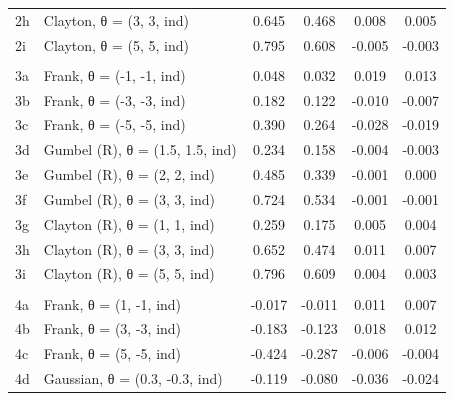 \documentclass[
]{article}
\begin{document}
\begin{longtable}[t]{llcccc}
\hspace{1em}2h & Clayton, θ = (3, 3, ind) & 0.645 & 0.468 & 0.008 & 0.005\\
\hspace{1em}2i & Clayton, θ = (5, 5, ind) & 0.795 & 0.608 & -0.005 & -0.003\\
\addlinespace[0.3em]
\multicolumn{6}{l}{\textbf{Scenario 3: (-, -, ind)}}\\
\hspace{1em}3a & Frank, θ = (-1, -1, ind) & 0.048 & 0.032 & 0.019 & 0.013\\
\hspace{1em}3b & Frank, θ = (-3, -3, ind) & 0.182 & 0.122 & -0.010 & -0.007\\
\hspace{1em}3c & Frank, θ = (-5, -5, ind) & 0.390 & 0.264 & -0.028 & -0.019\\
\hspace{1em}3d & Gumbel (R), θ = (1.5, 1.5, ind) & 0.234 & 0.158 & -0.004 & -0.003\\
\hspace{1em}3e & Gumbel (R), θ = (2, 2, ind) & 0.485 & 0.339 & -0.001 & 0.000\\
\hspace{1em}3f & Gumbel (R), θ = (3, 3, ind) & 0.724 & 0.534 & -0.001 & -0.001\\
\hspace{1em}3g & Clayton (R), θ = (1, 1, ind) & 0.259 & 0.175 & 0.005 & 0.004\\
\hspace{1em}3h & Clayton (R), θ = (3, 3, ind) & 0.652 & 0.474 & 0.011 & 0.007\\
\hspace{1em}3i & Clayton (R), θ = (5, 5, ind) & 0.796 & 0.609 & 0.004 & 0.003\\
\addlinespace[0.3em]
\multicolumn{6}{l}{\textbf{Scenario 4: (+, -, ind)}}\\
\hspace{1em}4a & Frank, θ = (1, -1, ind) & -0.017 & -0.011 & 0.011 & 0.007\\
\hspace{1em}4b & Frank, θ = (3, -3, ind) & -0.183 & -0.123 & 0.018 & 0.012\\
\hspace{1em}4c & Frank, θ = (5, -5, ind) & -0.424 & -0.287 & -0.006 & -0.004\\
\hspace{1em}4d & Gaussian, θ = (0.3, -0.3, ind) & -0.119 & -0.080 & -0.036 & -0.024\\

\end{longtable}
\end{document}
